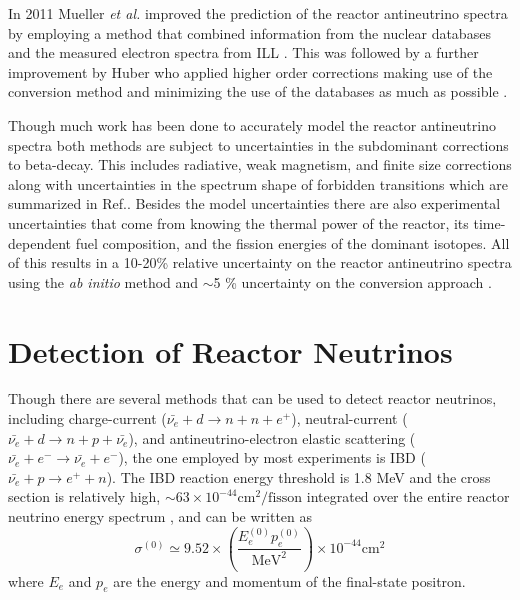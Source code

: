 In 2011 Mueller \textit{et al.} improved the prediction of the reactor antineutrino spectra by employing a method that combined information from the nuclear databases and the measured electron spectra from ILL \cite{Mueller}. 
This was followed by a further improvement by Huber who applied higher order corrections making use of the conversion method and minimizing the use of the databases as much as possible \cite{Huber}.

Though much work has been done to accurately model the reactor antineutrino spectra both methods are subject to uncertainties in the subdominant corrections to beta-decay. This includes radiative, weak magnetism, and finite size corrections along with uncertainties in the spectrum shape of forbidden transitions which are summarized in Ref.\cite{HayesVogel}. 
Besides the model uncertainties there are also experimental uncertainties that come from knowing the thermal power of the reactor, its time-dependent fuel composition, and the fission energies of the dominant isotopes.
All of this results in a 10-20\% relative uncertainty on the reactor antineutrino spectra using the \textit{ab initio} method and $\sim$5 \% uncertainty on the conversion approach \cite{Qian:2018wid}.



\section{Detection of Reactor Neutrinos}

Though there are several methods that can be used to detect reactor neutrinos, including charge-current ($\bar{\nu_e} + d \rightarrow n + n + e^+$), neutral-current ($\bar{\nu_e} + d \rightarrow n + p + \bar{\nu_e}$), and antineutrino-electron elastic scattering ($\bar{\nu_e} + e^- \rightarrow \bar{\nu_e} + e^-$), the one employed by most experiments is IBD ($\bar{\nu_e} + p \rightarrow e^+ + n$).
The IBD reaction energy threshold is 1.8 MeV and the cross section is relatively high, $\sim 63 \times 10^{-44} \textrm{cm}^2/\textrm{fisson}$ integrated over the entire reactor neutrino energy spectrum \cite{Qian:2018wid}, and can be written as
\begin{equation}
	\sigma^{(0)} \simeq 9.52 \times \left(\frac{E_e^{(0)}p_e^{(0)}}{\textrm{MeV}^2}\right) \times 10^{-44}\textrm{cm}^2
\end{equation}
where $E_e$ and $p_e$ are the energy and momentum of the final-state positron. 

